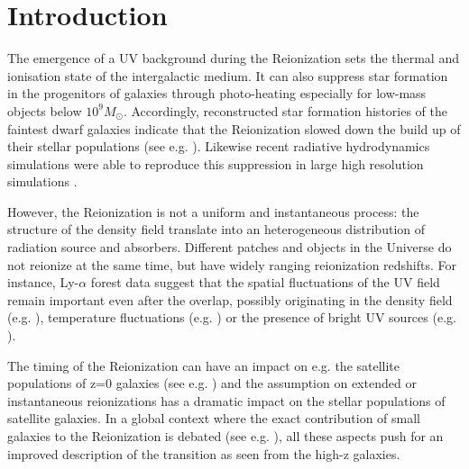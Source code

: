 \documentclass[twocolumn]{aastex61}
\begin{document}

\section{Introduction}
The emergence of a UV background during the Reionization sets the thermal and ionisation state of the intergalactic medium. It can also suppress star formation in the progenitors of galaxies through photo-heating especially for low-mass objects below $10^9 M_\odot$. Accordingly, reconstructed star formation histories of the faintest dwarf galaxies indicate that the Reionization slowed down the build up of their stellar populations (see e.g. \citet{BROWN14}). Likewise recent radiative hydrodynamics simulations were able to reproduce this suppression in large high resolution simulations \citep{OCV16}. 

However, the Reionization is not a uniform and instantaneous process: the structure of the density field translate into an heterogeneous distribution of radiation source and absorbers. Different patches and objects in the Universe do not reionize at the same time, but have widely ranging reionization redshifts. 
For instance, Ly-$\alpha$ forest data suggest that the spatial fluctuations of the UV field remain important even after the overlap, possibly originating in the density field (e.g. \citet{DAV16}), temperature fluctuations (e.g. \citet{ALO15}) or the presence of bright UV sources (e.g. \citet{CHA15}).

The timing of the Reionization can have an impact on e.g. the satellite populations of z=0 galaxies (see e.g. \citet{KOP9,BUS10,OCV11,ILI11,OCV14,GIL15})
and the assumption on extended or instantaneous reionizations has a dramatic impact on the stellar populations of satellite galaxies. In a global context where the exact contribution of small galaxies to the Reionization is debated (see e.g. \citet{BOU14,FIN15}), all these aspects push for an improved description of the transition as seen from the high-z galaxies. 
\end{document}
